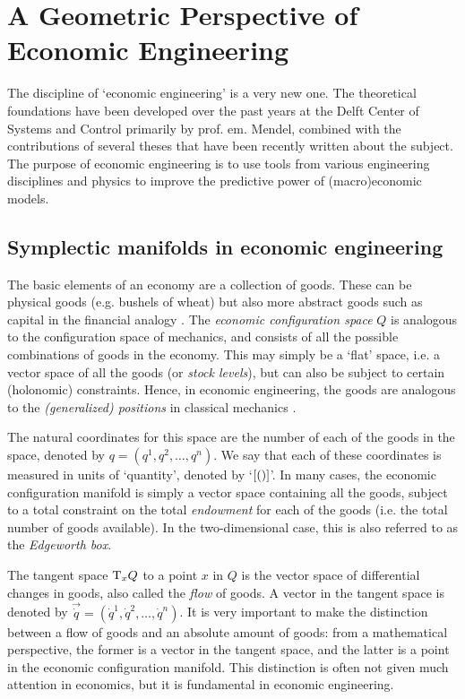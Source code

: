 \chapter{A Geometric Perspective of Economic Engineering}
\label{chap:symplectic_economics}

The discipline of `economic engineering' is a very new one. The theoretical foundations have been developed over the past years at the Delft Center of Systems and Control primarily by prof. em. Mendel, combined with the contributions of several theses that have been recently written about the subject. The purpose of economic engineering is to use tools from various engineering disciplines and physics to improve the predictive power of (macro)economic models.

\section{Symplectic manifolds in economic engineering}
The basic elements of an economy are a collection of goods. These can be physical goods (e.g. bushels of wheat) but also more abstract goods such as capital in the financial analogy \cite{Kruimer2021}. The \emph{economic configuration space} $Q$ is analogous to the configuration space of mechanics, and consists of all the possible combinations of goods in the economy. This may simply be a `flat' space, i.e. a vector space of all the goods (or \emph{stock levels}), but can also be subject to certain (holonomic) constraints. Hence, in economic engineering, the goods are analogous to the \emph{(generalized) positions} in classical mechanics \cite{Mendel2019}. 

The natural coordinates for this space are the number of each of the goods in the space, denoted by $q = (q^1, q^2, \ldots, q^n)$. We say that each of these coordinates is measured in units of `quantity', denoted by `$\qty[\si{\quantity}]$'. In many cases, the economic configuration manifold is simply a vector space containing all the goods, subject to a total constraint on the total \emph{endowment} for each of the goods (i.e. the total number of goods available). In the two-dimensional case, this is also referred to as the \emph{Edgeworth box}.

The tangent space $\mathrm{T}_{x} Q$ to a point $x$ in $Q$ is the vector space of differential changes in goods, also called the \emph{flow} of goods. A vector in the tangent space is denoted by $\vec{\dot{q}} = (\dot{q}^1, \dot{q}^2, \ldots, \dot{q}^n)$. It is very important to make the distinction between a flow of goods and an absolute amount of goods: from a mathematical perspective, the former is a vector in the tangent space, and the latter is a point in the economic configuration manifold. This distinction is often not given much attention in economics, but it is fundamental in economic engineering.

